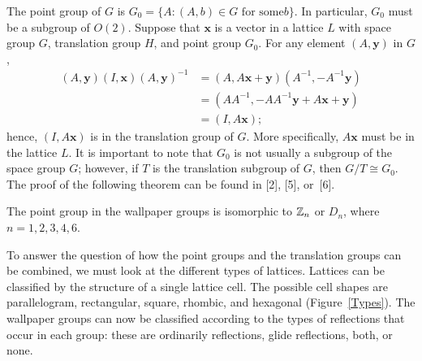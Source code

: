  
The point group of $G$ is $G_0 = \{A : (A,b) \in G \mbox{ for some
$b$}  \}$. In particular, $G_0$ must be a subgroup of $O(2)$. Suppose
that ${\mathbf x}$ is a vector in a lattice $L$ with space group $G$,
translation group $H$, and point group $G_0$. For any element $(A,
{\mathbf y})$ in $G$,   
\begin{align*}
(A, {\mathbf y}) (I, {\mathbf x}) (A, {\mathbf y})^{-1}
& =
(A,A {\mathbf x} + {\mathbf y}) (A^{-1},-A^{-1} {\mathbf y}) \\
& =
(A A^{-1},-A A^{-1} {\mathbf y} + A {\mathbf x} + {\mathbf y}) \\
& =
(I, A {\mathbf x});
\end{align*}
hence, $(I, A {\mathbf x})$ is in the translation group of $G$. More
specifically, $A {\mathbf x}$ must be in the lattice $L$. It is
important to note that $G_0$ is not usually a subgroup of the space
group $G$; however, if $T$ is the translation subgroup of $G$, then
$G/T \cong G_0$. The proof of the following theorem can be found in
[2], [5], or~[6].
 
 
 
\begin{theorem}
The point group in the wallpaper groups is isomorphic to ${\Bbb Z}_n$
or $D_n$, where $n = 1, 2, 3, 4, 6$. 
\end{theorem}
 
 
To answer the question of how the point groups and the translation
groups can be combined, we must look at the different types of
lattices. Lattices can be classified by the structure of a single
lattice cell. The possible cell shapes are parallelogram, rectangular,
square, rhombic, and hexagonal (Figure~\ref{Types}). The wallpaper
groups can now be classified according to the types of reflections
that occur in each group: these are ordinarily reflections, glide
reflections, both, or none.
 
 
 
